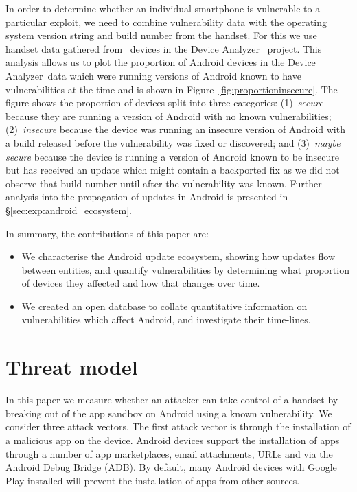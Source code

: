 \documentclass{llncs}
\newcommand{\da}{Device Analyzer}
\begin{document}
In order to determine whether an individual smartphone is vulnerable to a particular exploit, we need to combine vulnerability data with the operating system version string and build number from the handset. 
For this we use handset data gathered from \daNumOSDevices\ devices in the \da~\cite{Wagner2013} project.
This analysis allows us to plot the proportion of Android devices in the \da\ data which were running versions of Android known to have vulnerabilities at the time and is shown in Figure~\ref{fig:proportioninsecure}.
The figure shows the proportion of devices split into three categories:
(1)~\emph{secure} because they are running a version of Android with no known vulnerabilities; 
(2)~\emph{insecure} because the device was running an insecure version of Android with a build released before the vulnerability was fixed or discovered; and 
(3)~\emph{maybe secure} because the device is running a version of Android known to be insecure but has received an update which might contain a backported fix as we did not observe that build number until after the vulnerability was known.
Further analysis into the propagation of updates in Android is presented in \S\ref{sec:exp:android_ecosystem}.

In summary, the contributions of this paper are:
\begin{itemize}
 \item We characterise the Android update ecosystem, showing how updates flow between entities, and quantify vulnerabilities by determining what proportion of devices they affected and how that changes over time.
 \item We created an open database to collate quantitative information on vulnerabilities which affect Android, and investigate their time-lines.
\end{itemize}

\section{Threat model}
\label{sec:threatmodel}

In this paper we measure whether an attacker can take control of a handset by breaking out of the app sandbox on Android using a known vulnerability.
We consider three attack vectors.
The first attack vector is through the installation of a malicious app on the device.
Android devices support the installation of apps through a number of app marketplaces, email attachments, URLs and via the Android Debug Bridge (ADB).
By default, many Android devices with Google Play installed will prevent the installation of apps from other sources.
\end{document}
